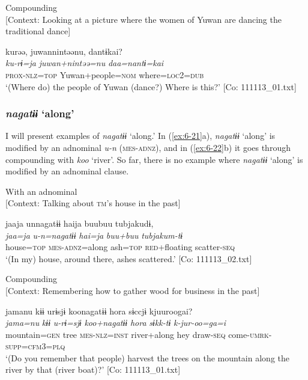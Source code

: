 \ex Compounding\\{}
[Context: Looking at a picture where the women of Yuwan are dancing the traditional dance]

{\TM}
\glll kurəə,  juwannintəənu,  dantɨkai?\\
      \textit{ku-rɨ=ja}  \textit{juwan+nintəə=nu}  \textit{daa=nantɨ=kai}\\
      \textsc{prox}-\textsc{nlz}=\textsc{top}  Yuwan+people=\textsc{nom}  where=\textsc{loc2}=\textsc{dub}\\
\glt ‘(Where do) the people of Yuwan (dance?) Where is this?’ [Co: 111113\_01.txt]
\z
\z

\subsubsection{\textit{nagatɨɨ} ‘along’}

I will present examples of \textit{nagatɨɨ} ‘along.’ In (\ref{ex:6-21}a), \textit{nagatɨɨ} ‘along’ is modified by an adnominal \textit{u-n} (\textsc{mes}-\textsc{adnz}), and in (\ref{ex:6-22}b) it goes through compounding with \textit{koo} ‘river’. So far, there is no example where \textit{nagatɨɨ} ‘along’ is modified by an adnominal clause.

\ea\label{ex:6-22}
\ea With an adnominal\\{}
[Context: Talking about \textsc{tm}’s house in the past]

{\TM}
\glll jaaja  unnagatɨɨ  haija  buubuu  tubjakudɨ,\\
      \textit{jaa=ja}  \textit{u-n=nagatɨɨ}  \textit{hai=ja}  \textit{buu+buu}  \textit{tubjakum-tɨ}\\
      house=\textsc{top}  \textsc{mes}-\textsc{adnz}=along  ash=\textsc{top}  \textsc{red}+floating  scatter-\textsc{seq}\\
\glt ‘(In my) house, around there, ashes scattered.’ [Co: 111113\_02.txt]

\ex Compounding\\{}
[Context: Remembering how to gather wood for business in the past]

{\TM}
\glll jamanu  kɨɨ  urɨsjɨ  koonagatɨɨ  {\textbar}hora{\textbar}   sɨccjɨ  kjuuroogai?\\
      \textit{jama=nu}  \textit{kɨɨ}  \textit{u-rɨ=sjɨ}  \textit{koo+nagatɨɨ}  \textit{hora}   \textit{sɨkk-tɨ}  \textit{k-jur-oo=ga=i}\\
      mountain=\textsc{gen}  tree  \textsc{mes}-\textsc{nlz}=\textsc{inst}  river+along  hey  draw-\textsc{seq}  come-\textsc{umrk}-\textsc{supp}=\textsc{cfm}3=\textsc{plq}\\
\glt ‘(Do you remember that people) harvest the trees on the mountain along the river by that (river boat)?’ [Co: 111113\_01.txt]
\z
\z

